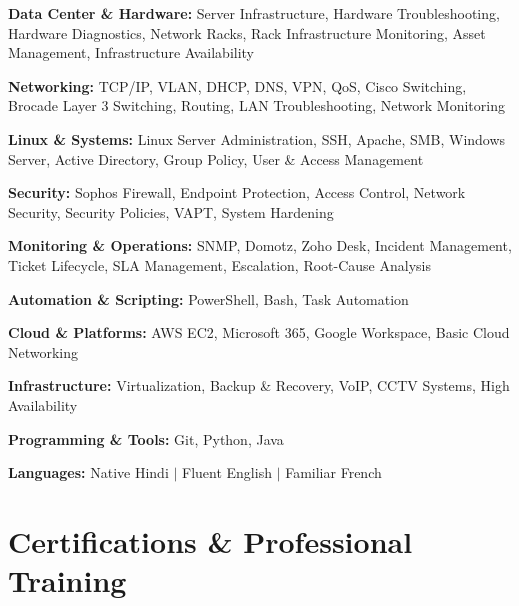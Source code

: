 \documentclass[letterpaper,10pt]{article}
\begin{document}
\begin{itemize}[leftmargin=0.15in]

    \small{\item{
        \textbf{Data Center \& Hardware:} Server Infrastructure, Hardware Troubleshooting, Hardware Diagnostics, Network Racks, Rack Infrastructure Monitoring, Asset Management, Infrastructure Availability
    }}

    \small{\item{
        \textbf{Networking:} TCP/IP, VLAN, DHCP, DNS, VPN, QoS, Cisco Switching, Brocade Layer 3 Switching, Routing, LAN Troubleshooting, Network Monitoring
    }}

    \small{\item{
        \textbf{Linux \& Systems:} Linux Server Administration, SSH, Apache, SMB, Windows Server, Active Directory, Group Policy, User \& Access Management
    }}

    \small{\item{
        \textbf{Security:} Sophos Firewall, Endpoint Protection, Access Control, Network Security, Security Policies, VAPT, System Hardening
    }}

    \small{\item{
        \textbf{Monitoring \& Operations:} SNMP, Domotz, Zoho Desk, Incident Management, Ticket Lifecycle, SLA Management, Escalation, Root-Cause Analysis
    }}

    \small{\item{
        \textbf{Automation \& Scripting:} PowerShell, Bash, Task Automation
    }}

    \small{\item{
        \textbf{Cloud \& Platforms:} AWS EC2, Microsoft 365, Google Workspace, Basic Cloud Networking
    }}

    \small{\item{
        \textbf{Infrastructure:} Virtualization, Backup \& Recovery, VoIP, CCTV Systems, High Availability
    }}

    \small{\item{
        \textbf{Programming \& Tools:} Git, Python, Java
    }}

    \small{\item{
        \textbf{Languages:} Native Hindi $|$ Fluent English $|$ Familiar French
    }}

\end{itemize}

\section{Certifications \& Professional Training}
\end{document}

